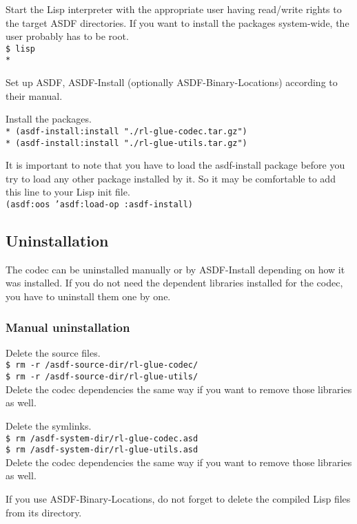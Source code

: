 \documentclass[11pt,a4paper,dvipdfm]{article}
\newcommand{\prompttext}[1]{\texttt{#1}}
\newcommand{\shprompt}[1]{\prompttext{\$ #1}}
\newcommand{\lispprompt}[1]{\prompttext{* #1}}
\begin{document}
Start the Lisp interpreter with the appropriate user having read/write rights
to the target ASDF directories. If you want to install the packages system-wide,
the user probably has to be root. \\
\shprompt{lisp} \\
\lispprompt{}

Set up ASDF, ASDF-Install (optionally ASDF-Binary-Locations) according to
their manual.

Install the packages. \\
\lispprompt{(asdf-install:install "./rl-glue-codec.tar.gz")} \\
\lispprompt{(asdf-install:install "./rl-glue-utils.tar.gz")}

It is important to note that you have to load the asdf-install package
before you try to load any other package installed by it. So it may be
comfortable to add this line to your Lisp init file. \\
\prompttext{(asdf:oos 'asdf:load-op :asdf-install)}

\subsection{Uninstallation}

The codec can be uninstalled manually or by ASDF-Install depending on how
it was installed.  If you do not need the dependent libraries installed for
the codec, you have to uninstall them one by one.

\subsubsection{Manual uninstallation}

Delete the source files. \\
\shprompt{rm -r /asdf-source-dir/rl-glue-codec/} \\
\shprompt{rm -r /asdf-source-dir/rl-glue-utils/} \\
Delete the codec dependencies the same way if you want to remove those
libraries as well.

Delete the symlinks. \\
\shprompt{rm /asdf-system-dir/rl-glue-codec.asd} \\
\shprompt{rm /asdf-system-dir/rl-glue-utils.asd} \\
Delete the codec dependencies the same way if you want to remove those
libraries as well.

If you use ASDF-Binary-Locations, do not forget to delete the compiled
Lisp files from its directory.
\end{document}
